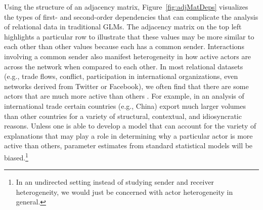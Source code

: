 Using the structure of an adjacency matrix, Figure~\ref{fig:adjMatDeps} visualizes the types of first- and second-order dependencies that can complicate the analysis of relational data in traditional GLMs. The adjacency matrix on the top left highlights a particular row to illustrate that these values may be more similar to each other than other values because each has a common sender. Interactions involving a common sender also manifest heterogeneity in how active actors are across the network when compared to each other. In most relational datasets (e.g., trade flows, conflict, participation in international organizations, even networks derived from Twitter or Facebook), we often find that there are some actors that are much more active than others \citep{barabasi:reka:1999}. For example, in an analysis of international trade certain countries (e.g., China) export much larger volumes than other countries for a variety of structural, contextual, and idiosyncratic reasons. Unless one is able to develop a model that can account for the variety of explanations that may play a role in determining why a particular actor is more active than others, parameter estimates from standard statistical models will be biased.\footnote{In an undirected setting instead of studying sender and receiver heterogeneity, we would just be concerned with actor heterogeneity in general.} 

